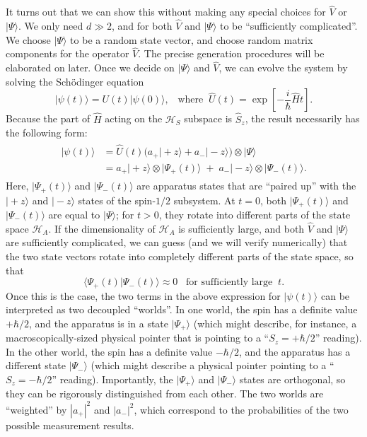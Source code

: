 \documentclass[pra,12pt]{revtex4-2}
\begin{document}
It turns out that we can show this without making any special choices
for $\hat{V}$ or $|\Psi\rangle$.  We only need $d \gg 2$, and for both
$\hat{V}$ and $|\Psi\rangle$ to be ``sufficiently complicated''.  We
choose $|\Psi\rangle$ to be a random state vector, and choose random
matrix components for the operator $\hat{V}$.  The precise generation
procedures will be elaborated on later.  Once we decide on
$|\Psi\rangle$ and $\hat{V}$, we can evolve the system by solving the
Sch\"odinger equation
\begin{equation}
  |\psi(t)\rangle = U(t)|\psi(0)\rangle, \;\;\;\mathrm{where}\;\; \hat{U}(t) = \exp\left[-\frac{i}{\hbar}\hat{H}t\right].
\end{equation}
Because the part of $\hat{H}$ acting on the $\mathscr{H}_S$ subspace
is $\hat{S}_z$, the result necessarily has the following form:
\begin{align}
  \begin{aligned}|\psi(t)\rangle &= \hat{U}(t)\Big(a_+ |\!+\!z\rangle + a_- |\!-\!z\rangle\Big) \otimes |\Psi\rangle \\ &= a_+ |\!+\!z\rangle \otimes |\Psi_+(t)\rangle \;+\; a_- |\!-\!z\rangle \otimes |\Psi_-(t)\rangle. \end{aligned}
\end{align}
Here, $|\Psi_+(t)\rangle$ and $|\Psi_-(t)\rangle$ are apparatus states
that are ``paired up'' with the $|\!+\!z\rangle$ and $|\!-\!z\rangle$
states of the spin-$1/2$ subsystem.  At $t=0$, both
$|\Psi_+(t)\rangle$ and $|\Psi_-(t)\rangle$ are equal to
$|\Psi\rangle$; for $t > 0$, they rotate into different parts of the
state space $\mathscr{H}_A$.  If the dimensionality of $\mathscr{H}_A$
is sufficiently large, and both $\hat{V}$ and $|\Psi\rangle$ are
sufficiently complicated, we can guess (and we will verify numerically) that
the two state vectors rotate into completely different parts of
the state space, so that
\begin{equation}
  \langle\Psi_+(t) | \Psi_-(t)\rangle \approx 0 \;\;\;\textrm{for sufficiently large}\;\; t.
\end{equation}
Once this is the case, the two terms in the above expression for
$|\psi(t)\rangle$ can be interpreted as two decoupled ``worlds''.  In
one world, the spin has a definite value $+\hbar/2$, and the apparatus
is in a state $|\Psi_+\rangle$ (which might describe, for instance, a
macroscopically-sized physical pointer that is pointing to a ``$S_z =
+\hbar/2$'' reading).  In the other world, the spin has a definite
value $-\hbar/2$, and the apparatus has a different state
$|\Psi_-\rangle$ (which might describe a physical pointer pointing to
a ``$S_z = -\hbar/2$'' reading).  Importantly, the $|\Psi_+\rangle$
and $|\Psi_-\rangle$ states are orthogonal, so they can be rigorously
distinguished from each other.  The two worlds are
``weighted'' by $|a_+|^2$ and $|a_-|^2$, which correspond to the
probabilities of the two possible measurement results.
\end{document}
